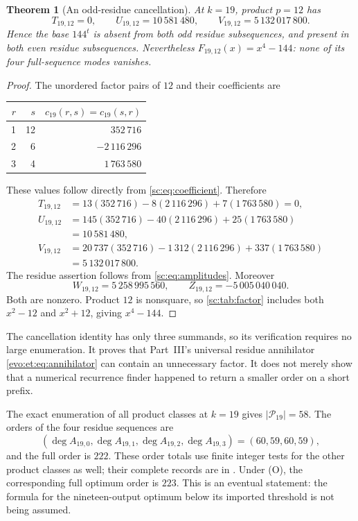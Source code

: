 \documentclass[11pt,a4paper]{article}
\numberwithin{equation}{section}
\newtheorem{theorem}{Theorem}[section]
\theoremstyle{definition}
\theoremstyle{remark}
\begin{document}
\begin{theorem}[An odd-residue cancellation]\label{sc:thm:k19}
At $k=19$, product $p=12$ has
\begin{equation}\label{sc:eq:19moments}
 T_{19,12}=0,\qquad U_{19,12}=10\,581\,480,
 \qquad V_{19,12}=5\,132\,017\,800.
\end{equation}
Hence the base $144^t$ is absent from both odd residue subsequences, and
present in both even residue subsequences. Nevertheless
$F_{19,12}(x)=x^4-144$: none of its four full-sequence modes vanishes.
\end{theorem}
\begin{proof}
The unordered factor pairs of $12$ and their coefficients are
\begin{center}
\begin{tabular}{@{}rrr@{}}
\toprule
$r$&$s$&$c_{19}(r,s)=c_{19}(s,r)$\\\midrule
1&12&$352\,716$\\
2&6&$-2\,116\,296$\\
3&4&$1\,763\,580$\\\bottomrule
\end{tabular}
\end{center}
These values follow directly from \eqref{sc:eq:coefficient}. Therefore
\begin{align*}
 T_{19,12}
 &=13(352\,716)-8(2\,116\,296)+7(1\,763\,580)=0,\\
 U_{19,12}
 &=145(352\,716)-40(2\,116\,296)+25(1\,763\,580)\\
 &=10\,581\,480,\\
 V_{19,12}
 &=20\,737(352\,716)-1\,312(2\,116\,296)+337(1\,763\,580)\\
 &=5\,132\,017\,800.
\end{align*}
The residue assertion follows from \eqref{sc:eq:amplitudes}. Moreover
\[
 W_{19,12}=5\,258\,995\,560,\qquad
 Z_{19,12}=-5\,005\,040\,040.
\]
Both are nonzero. Product $12$ is nonsquare, so \cref{sc:tab:factor} includes
both $x^2-12$ and $x^2+12$, giving $x^4-144$.
\end{proof}

The cancellation identity has only three summands, so its verification
requires no large enumeration. It proves that Part~III's universal
residue annihilator \eqref{evo:et:eq:annihilator} can contain an unnecessary factor. It does not merely
show that a numerical recurrence finder happened to return a smaller
order on a short prefix.

The exact enumeration of all product classes at $k=19$ gives
$|\mathcal P_{19}|=58$. The orders of the four residue sequences are
\begin{equation}\label{sc:eq:19orders}
 (\deg A_{19,0},\deg A_{19,1},\deg A_{19,2},\deg A_{19,3})
       =(60,59,60,59),
\end{equation}
and the full order is $222$. These order totals use finite integer tests
for the other product classes as well; their complete records are in
. Under (O), the corresponding full optimum
order is $223$. This is an eventual statement: the formula for the
nineteen-output optimum below its imported threshold is not being assumed.
\end{document}
